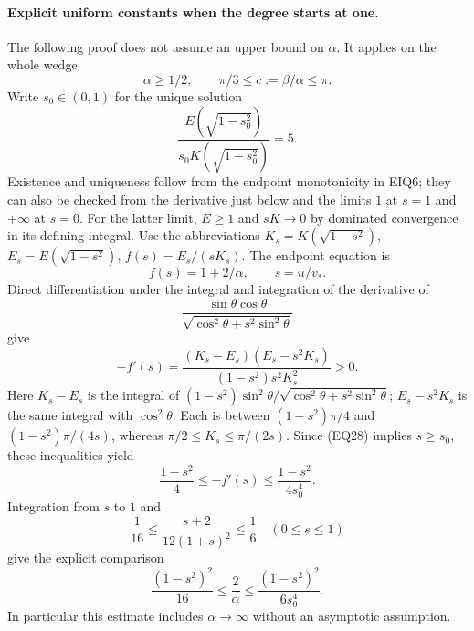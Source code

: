\paragraph{Explicit uniform constants when the degree starts at one.}
The following proof does not assume an upper bound on \(\alpha\).
It applies on the whole wedge
\[
 \alpha\ge1/2,\qquad \pi/3\le c:=\beta/\alpha\le\pi.
\tag{EQ28}
\]
Write \(s_0\in(0,1)\) for the unique solution
\[
 \frac{E(\sqrt{1-s_0^2})}
      {s_0K(\sqrt{1-s_0^2})}=5.
\tag{EQ29}
\]
Existence and uniqueness follow from the endpoint monotonicity in
EIQ6; they can also be checked from the derivative just below and the
limits \(1\) at \(s=1\) and \(+\infty\) at \(s=0\).
For the latter limit, \(E\ge1\) and
\(sK\to0\) by dominated convergence in its defining integral.
Use the abbreviations
\(K_s=K(\sqrt{1-s^2})\), \(E_s=E(\sqrt{1-s^2})\), \(f(s)=E_s/(sK_s)\).
The endpoint equation is
\[
 f(s)=1+2/\alpha,\qquad s=u/v_*.
\]
Direct differentiation under the integral and integration of the derivative
of
\[
\frac{\sin\theta\cos\theta}{\sqrt{\cos^2\theta+s^2\sin^2\theta}}
\]
give
\[
 -f'(s)=
 \frac{(K_s-E_s)(E_s-s^2K_s)}
      {(1-s^2)s^2K_s^2}>0.
\tag{EQ30}
\]
Here \(K_s-E_s\) is the integral of
\((1-s^2)\sin^2\theta/
\sqrt{\cos^2\theta+s^2\sin^2\theta}\);
\(E_s-s^2K_s\) is the same integral with \(\cos^2\theta\).
Each is between \((1-s^2)\pi/4\) and
\((1-s^2)\pi/(4s)\), whereas
\(\pi/2\le K_s\le\pi/(2s)\).
Since (EQ28) implies \(s\ge s_0\), these inequalities yield
\[
 \frac{1-s^2}{4}\le-f'(s)
       \le\frac{1-s^2}{4s_0^4}.
\]
Integration from \(s\) to \(1\) and
\[
 \frac1{16}\le\frac{s+2}{12(1+s)^2}\le\frac16
       \quad(0\le s\le1)
\]
give the explicit comparison
\[
 \frac{(1-s^2)^2}{16}\le\frac2\alpha
       \le\frac{(1-s^2)^2}{6s_0^4}.
\tag{EQ31}
\]
In particular this estimate includes \(\alpha\to\infty\) without
an asymptotic assumption.

